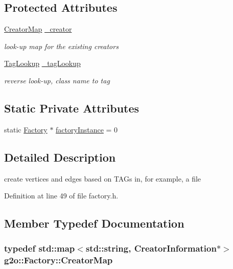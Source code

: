 \subsection*{Protected Attributes}
\begin{DoxyCompactItemize}
\item 
\hyperlink{classg2o_1_1Factory_a639c8d850892dddc20098e9aa97ef9e8}{Creator\+Map} \hyperlink{classg2o_1_1Factory_a38e27fb1014dfb8691f4df045ebb5130}{\+\_\+creator}
\begin{DoxyCompactList}\small\item\em look-\/up map for the existing creators \end{DoxyCompactList}\item 
\hyperlink{classg2o_1_1Factory_aba274179c053b3b71dcef6a20c898496}{Tag\+Lookup} \hyperlink{classg2o_1_1Factory_a93fbd79ea000ed88101c1f23b19e6e2a}{\+\_\+tag\+Lookup}
\begin{DoxyCompactList}\small\item\em reverse look-\/up, class name to tag \end{DoxyCompactList}\end{DoxyCompactItemize}
\subsection*{Static Private Attributes}
\begin{DoxyCompactItemize}
\item 
static \hyperlink{classg2o_1_1Factory}{Factory} $\ast$ \hyperlink{classg2o_1_1Factory_a4eab3a865dee18a71bb73246dc3e9f4b}{factory\+Instance} = 0
\end{DoxyCompactItemize}


\subsection{Detailed Description}
create vertices and edges based on T\+A\+Gs in, for example, a file 

Definition at line 49 of file factory.\+h.



\subsection{Member Typedef Documentation}
\subsubsection[{\texorpdfstring{Creator\+Map}{CreatorMap}}]{\setlength{\rightskip}{0pt plus 5cm}typedef std\+::map$<$std\+::string, {\bf Creator\+Information}$\ast$$>$ {\bf g2o\+::\+Factory\+::\+Creator\+Map}\hspace{0.3cm}{\ttfamily [protected]}}\hypertarget{classg2o_1_1Factory_a639c8d850892dddc20098e9aa97ef9e8}{}\label{classg2o_1_1Factory_a639c8d850892dddc20098e9aa97ef9e8}


